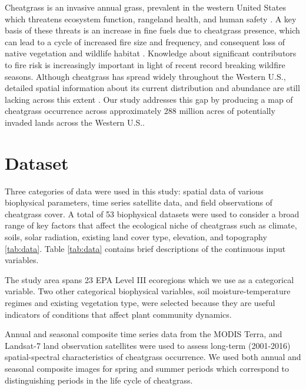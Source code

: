 \documentclass{article} %
\begin{document}
Cheatgrass is an invasive annual grass, prevalent in the western United States\citep{usda2015plants}  which threatens
ecosystem function, rangeland health, and human safety \citep{knapp1996cheatgrass}. A key basis of these
threats is an increase in fine fuels due to cheatgrass presence, which can lead to a cycle of increased fire size and frequency, and consequent loss
of native vegetation and wildlife habitat \citep{bradley2005identifying, pellant1990cheatgrass, melgoza1990soil}. Knowledge about significant contributors to fire risk is increasingly important
in light of recent record breaking wildfire seasons. Although cheatgrass has spread widely throughout
the Western U.S., detailed spatial information about its current distribution and abundance are still
lacking across this extent \citep{bradley2005identifying}. Our study addresses this gap by producing a
map of cheatgrass occurrence across approximately 288 million acres of potentially invaded lands across the Western U.S..

\section{Dataset}
Three categories of data were used in this study: spatial data of various biophysical parameters,
time series satellite data, and field observations of cheatgrass cover. 
A total of 53 biophysical datasets were used to consider a broad range of key factors that affect the ecological niche of cheatgrass such as climate, soils, solar radiation, existing land cover type, elevation, and topography \ref{tab:data}. Table \ref{tab:data} contains brief descriptions of the continuous input variables.

The study area spans 23 EPA Level III ecoregions \cite{omernik2014ecoregions} which we use as a categorical variable. 
Two other categorical biophysical variables, soil moisture-temperature regimes and existing vegetation type, 
were selected because they are useful indicators of conditions that affect plant community dynamics. 

Annual and seasonal composite time series  data from the MODIS Terra, and Landsat-7 land observation satellites were used to assess long-term (2001-2016) spatial-spectral characteristics of cheatgrass occurrence.
We used both annual and seasonal composite images for spring
and summer periods which correspond to distinguishing periods in the life cycle of cheatgrass. 
\end{document}
